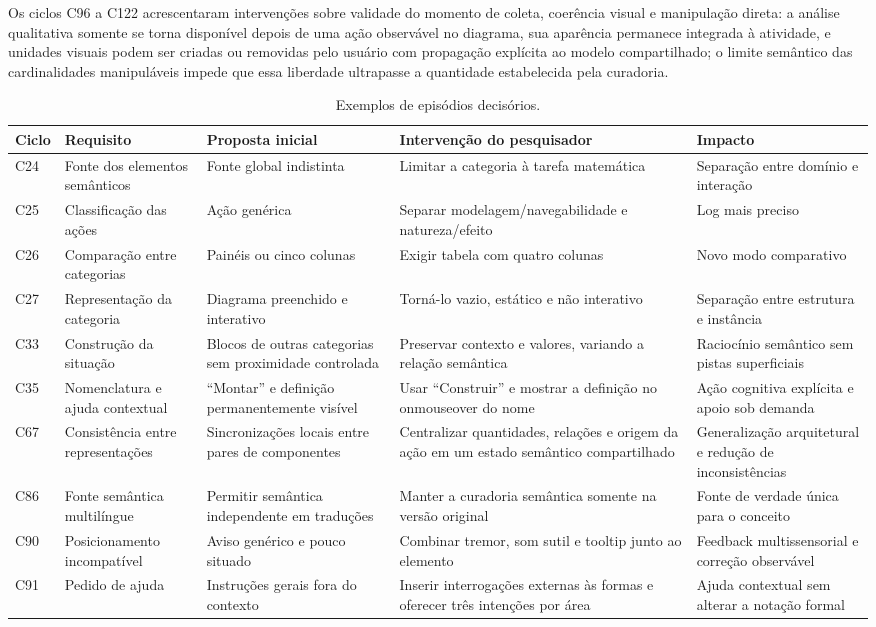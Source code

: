 \documentclass[preprint,12pt,authoryear]{elsarticle}
\begin{document}
Os ciclos C96 a C122 acrescentaram intervenções sobre validade do momento de coleta, coerência visual e manipulação direta: a análise qualitativa somente se torna disponível depois de uma ação observável no diagrama, sua aparência permanece integrada à atividade, e unidades visuais podem ser criadas ou removidas pelo usuário com propagação explícita ao modelo compartilhado; o limite semântico das cardinalidades manipuláveis impede que essa liberdade ultrapasse a quantidade estabelecida pela curadoria.

\begin{table}[ht]
\centering
\caption{Exemplos de episódios decisórios.}
\label{tab:episodios}
\small
\setlength{\tabcolsep}{4pt}
\begin{tabularx}{\textwidth}{p{0.9cm}p{2.6cm}X X p{2.3cm}}
\toprule
\textbf{Ciclo} & \textbf{Requisito} & \textbf{Proposta inicial} & \textbf{Intervenção do pesquisador} & \textbf{Impacto}\\
\midrule
C24 & Fonte dos elementos semânticos & Fonte global indistinta & Limitar a categoria à tarefa matemática & Separação entre domínio e interação\\
C25 & Classificação das ações & Ação genérica & Separar modelagem/navegabilidade e natureza/efeito & Log mais preciso\\
C26 & Comparação entre categorias & Painéis ou cinco colunas & Exigir tabela com quatro colunas & Novo modo comparativo\\
C27 & Representação da categoria & Diagrama preenchido e interativo & Torná-lo vazio, estático e não interativo & Separação entre estrutura e instância\\
C33 & Construção da situação & Blocos de outras categorias sem proximidade controlada & Preservar contexto e valores, variando a relação semântica & Raciocínio semântico sem pistas superficiais\\
C35 & Nomenclatura e ajuda contextual & ``Montar'' e definição permanentemente visível & Usar ``Construir'' e mostrar a definição no onmouseover do nome & Ação cognitiva explícita e apoio sob demanda\\
C67 & Consistência entre representações & Sincronizações locais entre pares de componentes & Centralizar quantidades, relações e origem da ação em um estado semântico compartilhado & Generalização arquitetural e redução de inconsistências\\
C86 & Fonte semântica multilíngue & Permitir semântica independente em traduções & Manter a curadoria semântica somente na versão original & Fonte de verdade única para o conceito\\
C90 & Posicionamento incompatível & Aviso genérico e pouco situado & Combinar tremor, som sutil e tooltip junto ao elemento & Feedback multissensorial e correção observável\\
C91 & Pedido de ajuda & Instruções gerais fora do contexto & Inserir interrogações externas às formas e oferecer três intenções por área & Ajuda contextual sem alterar a notação formal\\
\bottomrule
\end{tabularx}
\end{table}
\end{document}
